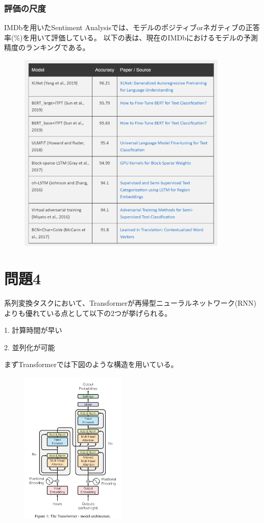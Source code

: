 \documentclass[a4j,11pt]{jarticle}
\begin{document}
\subsubsection*{評価の尺度}
IMDbを用いたSentiment Analysisでは、モデルのポジティブorネガティブの正答率(\%)を用いて評価している。
以下の表は、現在のIMDbにおけるモデルの予測精度のランキングである。
\begin{figure}[hbtp]
    \centering
    \includegraphics[width=10cm]{p3-3.png}
\end{figure}

\newpage
\section{問題4}
系列変換タスクにおいて、Transformerが再帰型ニューラルネットワーク(RNN)よりも優れている点として以下の2つが挙げられる。

1. 計算時間が早い

2. 並列化が可能

まずTransformerでは下図のような構造を用いている。

\begin{figure}[hbtp]
    \centering
    \includegraphics[width=5cm]{p4-2.png}
\end{figure}
\end{document}
